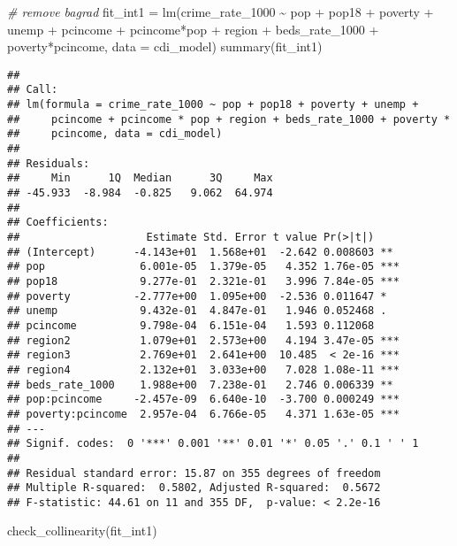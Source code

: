 \documentclass[
  11pt,
]{article}
\newenvironment{Shaded}{\begin{snugshade}}{\end{snugshade}}
\newcommand{\AttributeTok}[1]{\textcolor[rgb]{0.77,0.63,0.00}{#1}}
\newcommand{\CommentTok}[1]{\textcolor[rgb]{0.56,0.35,0.01}{\textit{#1}}}
\newcommand{\FunctionTok}[1]{\textcolor[rgb]{0.00,0.00,0.00}{#1}}
\newcommand{\NormalTok}[1]{#1}
\newcommand{\OtherTok}[1]{\textcolor[rgb]{0.56,0.35,0.01}{#1}}
\newcommand{\SpecialCharTok}[1]{\textcolor[rgb]{0.00,0.00,0.00}{#1}}
\begin{document}
\begin{Shaded}
\begin{Highlighting}[]
\CommentTok{\# remove bagrad}
\NormalTok{fit\_int1 }\OtherTok{=} \FunctionTok{lm}\NormalTok{(crime\_rate\_1000 }\SpecialCharTok{\textasciitilde{}}  
\NormalTok{                   pop }\SpecialCharTok{+}\NormalTok{ pop18 }\SpecialCharTok{+} 
\NormalTok{                  poverty }\SpecialCharTok{+}\NormalTok{ unemp }\SpecialCharTok{+}\NormalTok{ pcincome }\SpecialCharTok{+}\NormalTok{ pcincome}\SpecialCharTok{*}\NormalTok{pop }\SpecialCharTok{+}\NormalTok{ region }\SpecialCharTok{+}
\NormalTok{                  beds\_rate\_1000  }\SpecialCharTok{+}
\NormalTok{                  poverty}\SpecialCharTok{*}\NormalTok{pcincome, }\AttributeTok{data =}\NormalTok{ cdi\_model)}
\FunctionTok{summary}\NormalTok{(fit\_int1)}
\end{Highlighting}
\end{Shaded}

\begin{verbatim}
## 
## Call:
## lm(formula = crime_rate_1000 ~ pop + pop18 + poverty + unemp + 
##     pcincome + pcincome * pop + region + beds_rate_1000 + poverty * 
##     pcincome, data = cdi_model)
## 
## Residuals:
##     Min      1Q  Median      3Q     Max 
## -45.933  -8.984  -0.825   9.062  64.974 
## 
## Coefficients:
##                    Estimate Std. Error t value Pr(>|t|)    
## (Intercept)      -4.143e+01  1.568e+01  -2.642 0.008603 ** 
## pop               6.001e-05  1.379e-05   4.352 1.76e-05 ***
## pop18             9.277e-01  2.321e-01   3.996 7.84e-05 ***
## poverty          -2.777e+00  1.095e+00  -2.536 0.011647 *  
## unemp             9.432e-01  4.847e-01   1.946 0.052468 .  
## pcincome          9.798e-04  6.151e-04   1.593 0.112068    
## region2           1.079e+01  2.573e+00   4.194 3.47e-05 ***
## region3           2.769e+01  2.641e+00  10.485  < 2e-16 ***
## region4           2.132e+01  3.033e+00   7.028 1.08e-11 ***
## beds_rate_1000    1.988e+00  7.238e-01   2.746 0.006339 ** 
## pop:pcincome     -2.457e-09  6.640e-10  -3.700 0.000249 ***
## poverty:pcincome  2.957e-04  6.766e-05   4.371 1.63e-05 ***
## ---
## Signif. codes:  0 '***' 0.001 '**' 0.01 '*' 0.05 '.' 0.1 ' ' 1
## 
## Residual standard error: 15.87 on 355 degrees of freedom
## Multiple R-squared:  0.5802, Adjusted R-squared:  0.5672 
## F-statistic: 44.61 on 11 and 355 DF,  p-value: < 2.2e-16
\end{verbatim}

\begin{Shaded}
\begin{Highlighting}[]
\FunctionTok{check\_collinearity}\NormalTok{(fit\_int1)}
\end{Highlighting}
\end{Shaded}
\end{document}
